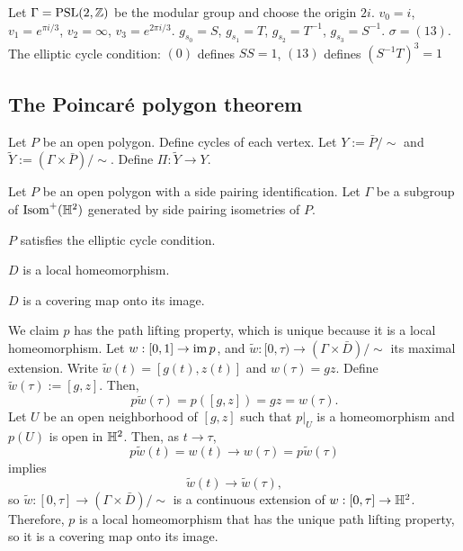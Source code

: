 \documentclass[a4paper]{article}
\begin{document}
\begin{prb}

\end{prb}

\begin{prb}
Let $\Gamma=\mathrm{PSL}(2,\mathbb{Z})$ be the modular group and choose the origin $2i$.
$v_0=i$, $v_1=e^{\pi i/3}$, $v_2=\infty$, $v_3=e^{2\pi i/3}$.
$g_{s_0}=S$, $g_{s_1}=T$, $g_{s_2}=T^{-1}$, $g_{s_3}=S^{-1}$.
$\sigma=(13)$.
The elliptic cycle condition: $(0)$ defines $SS=1$, $(13)$ defines $(S^{-1}T)^3=1$

\end{prb}






\subsection{The Poincar\'e polygon theorem}


\begin{prb}
\begin{parts}
\item
\end{parts}
\end{prb}

\begin{prb}
Let $P$ be an open polygon.
Define cycles of each vertex.
Let $Y:=\bar P/\sim$ and $\tilde Y:=(\Gamma\times\bar P)/\sim$.
Define $\Pi:\tilde Y\to Y$.
\begin{parts}
\item
\end{parts}
\end{prb}


\begin{prb}
Let $P$ be an open polygon with a side pairing identification.
Let $\Gamma$ be a subgroup of $\operatorname{Isom}^+(\mathbb{H}^2)$ generated by side pairing isometries of $P$.
\begin{parts}
\item $P$ satisfies the elliptic cycle condition.
\item $D$ is a local homeomorphism.
\item $D$ is a covering map onto its image.
\end{parts}
\end{prb}
\begin{pf}
We claim $p$ has the path lifting property, which is unique because it is a local homeomorphism.
Let $w:[0,1]\to\operatorname{im} p$, and $\tilde w:[0,\tau)\to(\Gamma\times\bar D)/\sim$ its maximal extension.
Write $\tilde w(t)=[g(t),z(t)]$ and $w(\tau)=gz$.
Define $\tilde w(\tau):=[g,z]$.
Then,
\[p\tilde w(\tau)=p([g,z])=gz=w(\tau).\]
Let $U$ be an open neighborhood of $[g,z]$ such that $p|_U$ is a homeomorphism and $p(U)$ is open in $\mathbb{H}^2$.
Then, as $t\to\tau$,
\[p\tilde w(t)=w(t)\to w(\tau)=p\tilde w(\tau)\]
implies
\[\tilde w(t)\to\tilde w(\tau),\]
so $\tilde w:[0,\tau]\to(\Gamma\times\bar D)/\sim$ is a continuous extension of $w:[0,\tau]\to\mathbb{H}^2$.
Therefore, $p$ is a local homeomorphism that has the unique path lifting property, so it is a covering map onto its image.
\end{pf}
\end{document}
